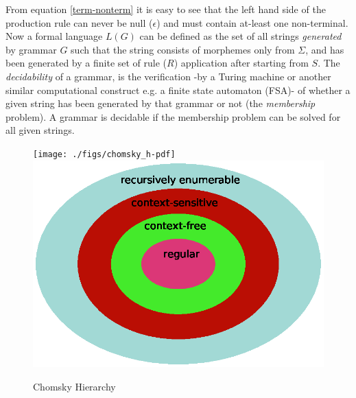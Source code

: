 From equation \ref{term-nonterm} it is easy to see that the left hand side of the production rule can never be null ($\epsilon$) and must contain at-least one non-terminal. Now a formal language $L(G)$ can be defined as the set of all strings  \textit{generated} by grammar $G$ such that the string consists of morphemes only from $\Sigma$, and has been generated by a finite set of rule ($R$) application after starting from $S$. The \textit{decidability} of a grammar, is the verification -by a Turing machine or another similar computational construct e.g. a finite state automaton (FSA)- of whether a given string has been generated by that grammar or not (the \textit{membership} problem). A grammar is decidable if the membership problem can be solved for all given strings.

\begin{figure}
	\begin{minipage}[t]{\textwidth}
		\ifpdf
		\texttt{[image: ./figs/chomsky\_h-pdf]}
		\else
		\includegraphics[width=\linewidth,keepaspectratio=true]{./figs/chomsky_h-eps}
		\fi
		\caption{\small Chomsky Hierarchy}
		\label{mtv:ch}
	\end{minipage}
\end{figure}

